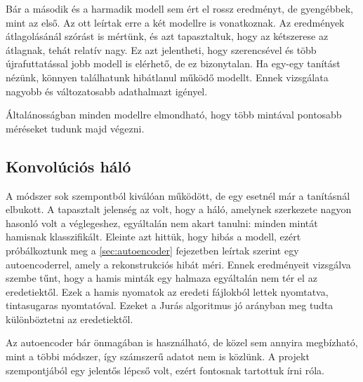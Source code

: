 Bár a második és a harmadik modell sem ért el rossz eredményt, de gyengébbek, mint az első. 
Az ott leírtak erre a két modellre is vonatkoznak. Az eredmények átlagolásánál szórást is mértünk, és azt tapasztaltuk, 
hogy az kétszerese az átlagnak, tehát relatív nagy. Ez azt jelentheti, hogy szerencsével és több 
újrafuttatással jobb modell is elérhető, de ez bizonytalan. Ha egy-egy tanítást nézünk, könnyen
találhatunk hibátlanul működő modellt. Ennek vizsgálata nagyobb és változatosabb adathalmazt igényel.

Általánosságban minden modellre elmondható, hogy több mintával pontosabb méréseket tudunk majd végezni.



%
%
%
%


%

\newpage
\subsection{Konvolúciós háló}
\label{sec:autoencoder.jelentoseg}

A módszer sok szempontból kiválóan működött, de egy esetnél már a tanításnál elbukott. 
A tapasztalt jelenség az volt, hogy a háló, amelynek szerkezete nagyon hasonló volt 
a véglegeshez, egyáltalán nem akart tanulni: minden mintát hamisnak klasszifikált.
Eleinte azt hittük, hogy hibás a modell, ezért próbálkoztunk meg a \ref{sec:autoencoder}
fejezetben leírtak szerint egy autoencoderrel, amely a rekonstrukciós hibát méri.
Ennek eredményeit vizsgálva szembe tűnt, hogy a hamis minták egy halmaza egyáltalán nem 
tér el az eredetiektől. Ezek a hamis nyomatok az eredeti fájlokból lettek nyomtatva, 
tintasugaras nyomtatóval. Ezeket a Jurás algoritmus jó arányban meg tudta 
különböztetni az eredetiektől.


Az autoencoder bár önmagában is használható, de közel sem annyira megbízható, mint a többi 
módszer, így számszerű adatot nem is közlünk. A projekt szempontjából egy jelentős lépcső volt,
 ezért fontosnak tartottuk írni róla.

